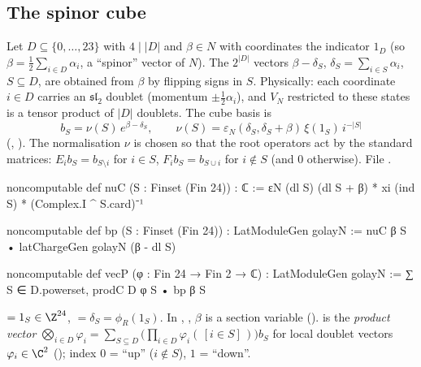 \subsection{The spinor cube}
Let $D\subseteq\{0,\dots,23\}$ with $4\mid|D|$ and $\beta\in N$ with coordinates the indicator $1_D$ (so $\beta=\tfrac12\sum_{i\in
D}\alpha_i$, a ``spinor'' vector of $N$). The $2^{|D|}$ vectors $\beta-\delta_S$, $\delta_S=\sum_{i\in S}\alpha_i$, $S\subseteq D$,
are obtained from $\beta$ by flipping signs in $S$. Physically: each coordinate $i\in D$ carries an
$\mathfrak{sl}_2$ doublet (momentum $\pm\tfrac12\alpha_i$), and $V_N$ restricted to these states is a tensor product of
$|D|$ doublets. The cube basis is
\begin{equation*}
  b_S=\nu(S)\,e^{\beta-\delta_S},\qquad \nu(S)=\varepsilon_N(\delta_S,\delta_S+\beta)\,\xi(1_S)\,i^{-|S|}
\end{equation*}
(, ). The normalisation $\nu$ is chosen so that the root operators act by the standard
matrices: $E_i b_S=b_{S\setminus i}$ for $i\in S$, $F_ib_S=b_{S\cup i}$ for $i\notin S$ (and $0$ otherwise).
\noindent File .
\begin{leancode}
noncomputable def nuC (S : Finset (Fin 24)) : ℂ :=
  εN (dl S) (dl S + β) * xi (ind S) * (Complex.I ^ S.card)⁻¹

noncomputable def bp (S : Finset (Fin 24)) : LatModuleGen golayN :=
  nuC β S • latChargeGen golayN (β - dl S)

noncomputable def vecP (φ : Fin 24 → Fin 2 → ℂ) : LatModuleGen golayN :=
  ∑ S ∈ D.powerset, prodC D φ S • bp β S
\end{leancode}
\begin{dictionary}
 $=1_S\in\Z^{24}$,  $=\delta_S=\phi_R(1_S)$. In , , $\beta$ is a section
variable ().  is the \emph{product vector}
$\bigotimes_{i\in D}\varphi_i=\sum_{S\subseteq D}\bigl(\prod_{i\in D}\varphi_i(\,[i\in S]\,)\bigr)b_S$ for local doublet vectors
$\varphi_i\in\C^2$ (); index $0$ = ``up'' ($i\notin S$), $1$ = ``down''.
\end{dictionary}

